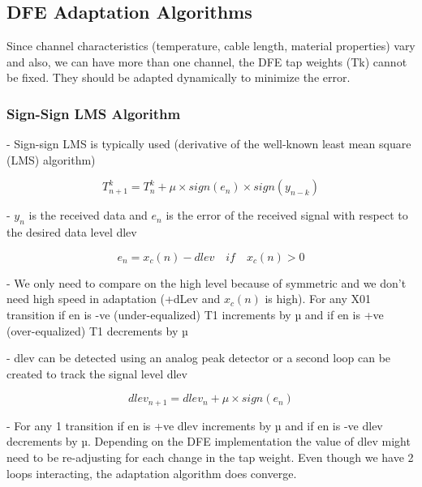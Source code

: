 \subsection{DFE Adaptation Algorithms}

Since channel characteristics (temperature, cable length, material properties) vary and also, we can have more than one channel, the DFE tap weights (Tk) cannot be fixed. They should be adapted dynamically to minimize the error.

\subsubsection{Sign-Sign LMS Algorithm}
- Sign-sign LMS is typically used (derivative of the well-known least mean square (LMS) algorithm)

\begin{equation}
    T_{n+1}^{k} = T_{n}^{k} + \mu \times sign(e_n) \times sign(y_{n-k}) \tag{6.1}
\end{equation}

- $y_n$ is the received data and $e_n$ is the error of the received signal with respect to the desired data level dlev

\begin{equation}
    e_n = x_c(n) - dlev \quad if \quad x_c(n) > 0 \tag{6.2}
\end{equation}

- We only need to compare on the high level because of symmetric and we don't need high speed in adaptation (+dLev and $x_c(n)$ is high). For any X01 transition if en is -ve (under-equalized) T1 increments by µ and if en is +ve (over-equalized) T1 decrements by µ

- dlev can be detected using an analog peak detector or a second loop can be created to track the signal level dlev

\begin{equation}
    dlev_{n+1} = dlev_n + \mu \times sign(e_n) \tag{6.3}
\end{equation}

- For any 1 transition if en is +ve dlev increments by µ and if en is -ve dlev decrements by µ. Depending on the DFE implementation the value of dlev might need to be re-adjusting for each change in the tap weight. Even though we have 2 loops interacting, the adaptation algorithm does converge.